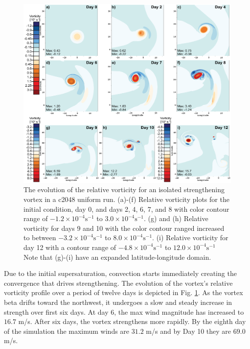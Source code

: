 \begin{figure}
    \centerline{%
    \noindent
    \includegraphics[width=\textwidth]{Chap2/c2048_vort_intime-01.eps}}
   \caption{The evolution of the relative vorticity for an isolated strengthening vortex in a c2048 uniform run.
   (a)-(f) Relative vorticity plots for the initial condition, day 0, and days 2, 4, 6, 7, and 8 with color contour
   range of $-1.2 \times 10^{-4} \mathrm{ s}^{-1}$ to $3.0 \times 10^{-4} \mathrm{ s}^{-1}$. (g) and (h) Relative 
   vorticity for days 9 and 10 with the color contour ranged increased to between 
   $-3.2 \times 10^{-4} \mathrm{ s}^{-1}$ to $8.0 \times 10^{-4} \mathrm{ s}^{-1}$. (i) Relative vorticity for
   day 12 with a contour range of $-4.8 \times 10^{-4} \mathrm{ s}^{-1}$ to $12.0 \times 10^{-4} \mathrm{ s}^{-1}$
   Note that (g)-(i) have an expanded latitude-longitude domain.}%
    \label{fig:c2048_vortseries}
\end{figure}

    
   Due to the initial supersaturation, convection starts immediately creating 
   the convergence that drives strengthening. The evolution of the vortex's relative vorticity
   profile over a period of twelve days is depicted in Fig. \ref{fig:c2048_vortseries}.
   As the vortex beta drifts toward the northwest, 
   it undergoes a slow and steady increase in strength over first six days. 
   At day 6, the max wind magnitude has increased to $16.7$ m/s. After six days, the vortex 
   strengthens more rapidly. By the eighth day of the simulation the maximum winds 
   are $31.2$ m/s and by Day 10 they are $69.0$ m/s. 
   
